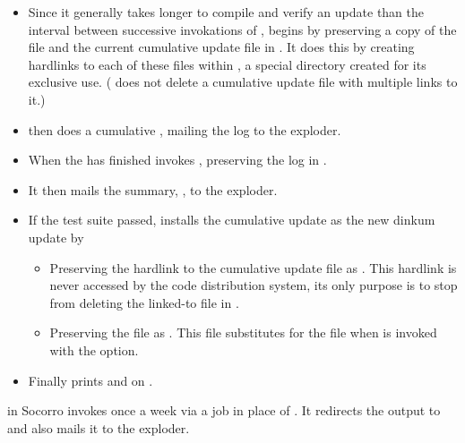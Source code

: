 \begin{itemize}
\item
   Since it generally takes longer to compile and verify an update than the
   interval between successive invokations of , 
   begins by preserving a copy of the  file and the current
   cumulative update file in .  It does this by creating
   hardlinks to each of these files within , a
   special directory created for its exclusive use.  ( does
   not delete a cumulative update file with multiple links to it.)

\item
    then does a cumulative , mailing the log to
   the  exploder.

\item
   When the  has finished  invokes
   , preserving the log in .

\item
   It then mails the summary, , to the
    exploder.

\item
   If the test suite passed,  installs the cumulative update as
   the new dinkum update by
   \begin{itemize}
   \item
      Preserving the hardlink to the cumulative update file as
      .  This hardlink is never accessed by
      the code distribution system, its only purpose is to stop
       from deleting the linked-to file in .
   \item
      Preserving the  file as .  This
      file substitutes for the  file when  is
      invoked with the  option. 
   \end{itemize}

\item
   Finally  prints  
   and  on .
\end{itemize}

\noindent
{} in Socorro invokes  once a week via a
 job in place of .  It redirects the output
to  and also mails it to the
 exploder.

